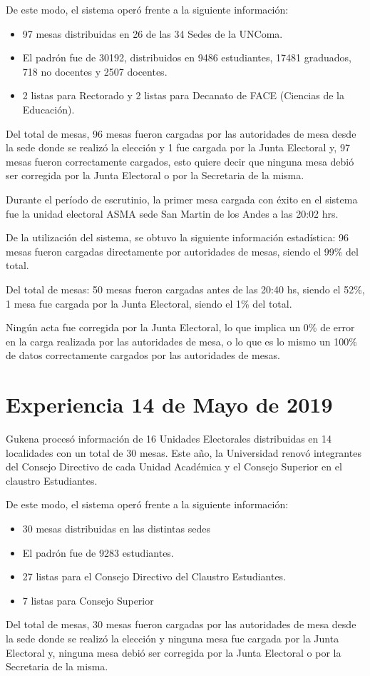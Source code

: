 De este modo, el sistema operó frente a la siguiente información:

\begin{itemize}
    \item 97 mesas distribuidas en 26 de las 34 Sedes de la UNComa.
     \item El padrón fue de  30192, distribuidos en 9486 estudiantes, 17481 graduados, 718 no docentes y 2507 docentes.
     \item 2 listas para Rectorado y 2 listas para Decanato de FACE (Ciencias de la Educación).
\end{itemize}
Del total de mesas, 96 mesas fueron cargadas por las autoridades de mesa desde la sede donde se realizó la elección y 1 fue cargada por la Junta Electoral y, 97 mesas fueron correctamente cargados, esto quiere decir que ninguna mesa debió ser corregida por la Junta Electoral o por la Secretaria de la misma.

Durante el período de escrutinio, la primer mesa cargada con éxito en el sistema fue la unidad electoral ASMA sede San Martin de los Andes a las 20:02 hrs.

De la utilización del sistema, se obtuvo la siguiente información estadística:
96 mesas fueron cargadas directamente por autoridades de mesas, siendo el 99\% del total.

Del total de mesas:
50 mesas fueron cargadas antes de las 20:40 hs, siendo el 52\%,
1 mesa fue cargada 	por la Junta Electoral, siendo el 1\% del total.

Ningún acta fue corregida por la Junta Electoral, lo que implica un 0\% de error en la carga realizada por las autoridades de mesa, o lo que es lo mismo un 100\% de datos correctamente cargados por las autoridades de mesas.

\section{Experiencia 14 de Mayo de 2019}
Gukena procesó información de 16 Unidades Electorales distribuidas en 14 localidades con un total de 30 mesas. Este año, la Universidad renovó integrantes del Consejo Directivo de cada Unidad Académica y el Consejo Superior en el claustro Estudiantes.

De este modo, el sistema operó frente a la siguiente información:
\begin{itemize}
    \item 30 mesas distribuidas en las distintas sedes
     \item El padrón fue de  9283 estudiantes.
     \item 27 listas para el Consejo Directivo del Claustro Estudiantes.
     \item 7 listas para Consejo Superior
\end{itemize}
Del total de mesas, 30 mesas fueron cargadas por las autoridades de mesa desde la sede donde se realizó la elección y ninguna mesa fue cargada por la Junta Electoral y, ninguna mesa debió ser corregida por la Junta Electoral o por la Secretaria de la misma.

